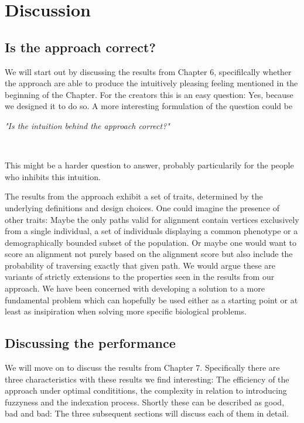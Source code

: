 \documentclass[thesis.tex]{subfiles}
\begin{document}
\chapter{Discussion}
\section{Is the approach correct?}
We will start out by discussing the results from Chapter 6, specifilcally whether the approach are able to produce the intuitively pleasing feeling mentioned in the beginning of the Chapter. For the creators this is an easy question: Yes, because we designed it to do so. A more interesting formulation of the question could be\\
\par\noindent
\centerline{\textit{"Is the intuition behind the approach correct?"}}\\
\par\noindent
This might be a harder question to answer, probably particularily for the people who inhibits this intuition. \\
\par\noindent
The results from the approach exhibit a set of traits, determined by the underlying definitions and design choices. One could imagine the presence of other traits: Maybe the only paths valid for alignment contain vertices exclusively from a single individual, a set of individuals displaying a common phenotype or a demographically bounded subset of the population. Or maybe one would want to score an alignment not purely based on the alignment score but also include the probability of traversing exactly that given path. We would argue these are variants of strictly extensions to the properties seen in the results from our approach. We have been concerned with developing a solution to a more fundamental problem which can hopefully be used either as a starting point or at least as insipiration when solving more specific biological problems. 
\section{Discussing the performance}
We will move on to discuss the results from Chapter 7. Specifically there are three characteristics with these results we find interesting: The efficiency of the approach under optimal condititions, the complexity in relation to introducing fuzzyness and the indexation process. Shortly these can be described as good, bad and bad: The three subsequent sections will discuss each of them in detail.
\end{document}

